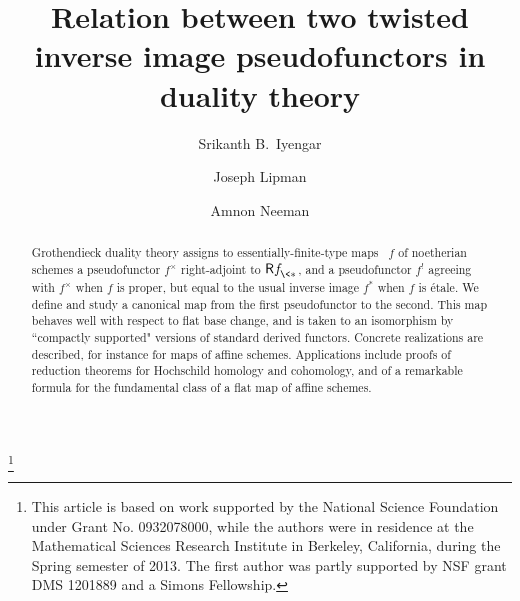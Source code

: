 \documentclass{compositio}
\theoremstyle{plain}
\theoremstyle{definition}
\theoremstyle{remark}
\numberwithin{equation}{thm}
\begin{document}
\title[Relation between two twisted inverse image pseudofunctors]{Relation between two twisted inverse image pseudofunctors in duality theory}

\author[S.\,B.\,Iyengar]{Srikanth B.~Iyengar} 
\address{Department of Mathematics,  University of Nebraska, Lincoln, NE 68588, U.S.A.}  

\author[J.\,Lipman]{Joseph Lipman} 
\address{Department of Mathematics,  Purdue University, West Lafayette IN 47907, U.S.A.}

\author[A.\,Neeman]{Amnon Neeman} 
\address{Centre for Mathematics and its Applications, Mathematical Sciences Institute
Australian National University, Canberra, ACT 0200, Australia.}

\thanks{This article is based on work supported by the National Science Foundation under Grant No. 0932078000, while the authors were in residence at the Mathematical Sciences Research Institute in Berkeley, California, during the Spring semester of 2013.  The first author was partly supported by NSF  grant DMS 1201889 and a Simons Fellowship.}
  


\begin{abstract}  Grothendieck duality theory assigns to essentially-finite-type maps~
$f$ of noetherian schemes a pseudofunctor $f^\times$ 
right-adjoint to ${\mathsf R}{{f^{}_{{\mkern-1mu}\<*}}}$, and a pseudofunctor $f^!$ agreeing with $f^\times$ when
$f$ is proper, but equal to the usual inverse image $f^*$ when $f$ is \'etale. We define and study a canonical map from the first pseudofunctor to the second. This map behaves well with respect to flat base change, and is taken to an isomorphism by ``compactly supported" versions of standard derived functors. Concrete realizations are described, for instance for maps of affine schemes. Applications include proofs of reduction theorems for Hochschild homology and cohomology, and of a remarkable formula for the fundamental class of 
a flat map of affine schemes.
 \end{abstract}

\maketitle
\end{document}
